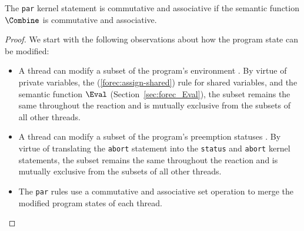 \begin{theorem}
	\label{thm:commute_associate_par}
	The \verb$par$ kernel statement is commutative and associative if the 
	semantic function $\Combine$ is commutative and associative.
\end{theorem}
\begin{proof}
	We start with the following observations about how the program state can be modified:
	\begin{itemize}
		\item A thread can modify a subset of the program's environment 
			  \Environment{}. By virtue of private variables, the (\ref{forec:assign-shared}) 
			  rule for shared variables, and the semantic 
			  function $\Eval$ (Section~\ref{sec:forec_Eval}), the subset remains 
			  the same throughout the reaction and is mutually exclusive from the
			  subsets of all other threads.
		
		\item A thread can modify a subset of the program's preemption statuses \Abort{}. 
			  By virtue of translating the \verb$abort$ statement into the \verb$status$ 
			  and \verb$abort$ kernel statements, the subset remains the same throughout
			  the reaction and is mutually exclusive from the subsets of all other threads.
			  
		\item The \verb$par$ rules use a commutative and associative set operation to
			  merge the modified program states of each thread.


\end{itemize}
\end{proof}
